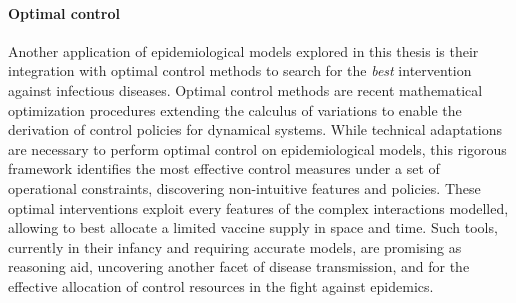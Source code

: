 \paragraph{Optimal control} Another application of epidemiological models explored in this thesis is their integration with optimal control methods to search for the \textit{best} intervention against infectious diseases. Optimal control methods are recent mathematical optimization procedures extending the calculus of variations to enable the derivation of control policies for dynamical systems. While technical adaptations are necessary to perform optimal control on epidemiological models, this rigorous framework identifies the most effective control measures under a set of operational constraints, discovering non-intuitive features and policies. These optimal interventions exploit every features of the complex interactions modelled, allowing to \eg best allocate a limited vaccine supply in space and time. Such tools, currently in their infancy and requiring accurate models, are promising as reasoning aid, uncovering another facet of disease transmission, and for the effective allocation of control resources in the fight against epidemics.




